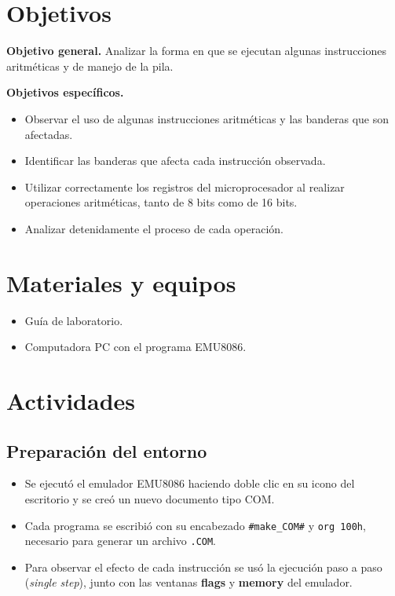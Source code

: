 \documentclass[10pt]{article}
\begin{document}
\newpage
\tableofcontents
\thispagestyle{plain}
\clearpage

\section{Objetivos}
 
\textbf{Objetivo general.} Analizar la forma en que se ejecutan algunas instrucciones aritméticas y de manejo de la pila.

\textbf{Objetivos específicos.}

\begin{itemize}
  \item Observar el uso de algunas instrucciones aritméticas y las banderas que son afectadas.
  \item Identificar las banderas que afecta cada instrucción observada.
  \item Utilizar correctamente los registros del microprocesador al realizar operaciones aritméticas, tanto de 8 bits como de 16 bits.
  \item Analizar detenidamente el proceso de cada operación.
\end{itemize}
 
\section{Materiales y equipos}
 
\begin{itemize}
  \item Guía de laboratorio.
  \item Computadora PC con el programa EMU8086.
\end{itemize}
 
\section{Actividades}
 
\subsection{Preparación del entorno}
 
\begin{itemize}
  \item Se ejecutó el emulador EMU8086 haciendo doble clic en su icono del escritorio y se creó un nuevo documento tipo COM.
  \item Cada programa se escribió con su encabezado \texttt{\#make\_COM\#} y \texttt{org 100h}, necesario para generar un archivo \texttt{.COM}.
  \item Para observar el efecto de cada instrucción se usó la ejecución paso a paso (\textit{single step}), junto con las ventanas \textbf{flags} y \textbf{memory} del emulador.
\end{itemize}
 
\end{document}
